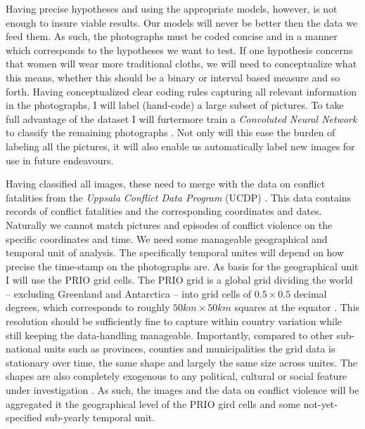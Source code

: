 \documentclass[a4paper]{article}
\begin{document}
Having precise hypotheses and using the appropriate models, however, is not enough to insure viable results. Our models will never be better then the data we feed them. As such, the photographs must be coded concise and in a manner which corresponds to the hypotheses we want to test. If one hypothesis concerns that women will wear more traditional cloths, we will need to conceptualize what this means, whether this should be a binary or interval based measure and so forth. Having conceptualized clear coding rules capturing all relevant information in the photographs, I will label (hand-code) a large subset of pictures. To take full advantage of the dataset I will furtermore train a \emph{Convoluted Neural Network} to classify the remaining photographs \citep[120-122]{francois2017deep}. Not only will this ease the burden of labeling all the pictures, it will also enable us automatically label new images for use in future endeavours.\par    

Having classified all images, these need to merge with the data on conflict fatalities from the \emph{Uppsala Conflict Data Program} (UCDP) \citep{Sundberg_2013, Croicu_Sundberg_2017, UCDP_2017}. This data contains records of conflict fatalities and the corresponding coordinates and dates. Naturally we cannot match pictures and episodes of conflict violence on the specific coordinates and time. We need some manageable geographical and temporal unit of analysis. The specifically temporal unites will depend on how precise the time-stamp on the photographs are. As basis for the geographical unit I will use the PRIO grid cells. The PRIO grid is a global grid dividing the world -- excluding Greenland and Antarctica -- into grid cells of $0.5 \times 0.5$ decimal degrees, which corresponds to roughly $50km\times50km$ squares at the equator \citep[367]{Tollefsen_2012}. This resolution should be sufficiently fine to capture within country variation while still keeping the data-handling manageable. Importantly, compared to other sub-national units such as provinces, counties and municipalities the grid data is stationary over time, the same shape and largely the same size across unites. The shapes are also completely exogenous to any political, cultural or social feature under investigation \citep[356]{Tollefsen_2012}. As such, the images and the data on conflict violence will be aggregated it the geographical level of the PRIO gird cells and some not-yet-specified sub-yearly temporal unit.\par
\end{document}
